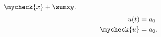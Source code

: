 \documentclass{article}
\begin{document}
$\mycheck{x}+\sumx y$.
\begin{align}
u(t) &= a_0\\
\mycheck{u} &= a_0.
\end{align}
\end{document}
